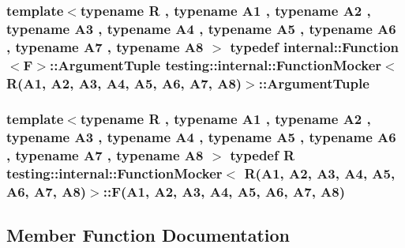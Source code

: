 \subsubsection[{\texorpdfstring{Argument\+Tuple}{ArgumentTuple}}]{\setlength{\rightskip}{0pt plus 5cm}template$<$typename R , typename A1 , typename A2 , typename A3 , typename A4 , typename A5 , typename A6 , typename A7 , typename A8 $>$ typedef {\bf internal\+::\+Function}$<${\bf F}$>$\+::{\bf Argument\+Tuple} {\bf testing\+::internal\+::\+Function\+Mocker}$<$ R(A1, A2, A3, A4, A5, A6, A7, A8)$>$\+::{\bf Argument\+Tuple}}\hypertarget{classtesting_1_1internal_1_1FunctionMocker_3_01R_07A1_00_01A2_00_01A3_00_01A4_00_01A5_00_01A6_00_01A7_00_01A8_08_4_a57bc2be00815deac8964e2d2ae62fdd2}{}\label{classtesting_1_1internal_1_1FunctionMocker_3_01R_07A1_00_01A2_00_01A3_00_01A4_00_01A5_00_01A6_00_01A7_00_01A8_08_4_a57bc2be00815deac8964e2d2ae62fdd2}
\subsubsection[{\texorpdfstring{F}{F}}]{\setlength{\rightskip}{0pt plus 5cm}template$<$typename R , typename A1 , typename A2 , typename A3 , typename A4 , typename A5 , typename A6 , typename A7 , typename A8 $>$ typedef R {\bf testing\+::internal\+::\+Function\+Mocker}$<$ R(A1, A2, A3, A4, A5, A6, A7, A8)$>$\+::F(A1, A2, A3, A4, A5, A6, A7, A8)}\hypertarget{classtesting_1_1internal_1_1FunctionMocker_3_01R_07A1_00_01A2_00_01A3_00_01A4_00_01A5_00_01A6_00_01A7_00_01A8_08_4_ad9749c93b0a17540778c5fa162a5fe6c}{}\label{classtesting_1_1internal_1_1FunctionMocker_3_01R_07A1_00_01A2_00_01A3_00_01A4_00_01A5_00_01A6_00_01A7_00_01A8_08_4_ad9749c93b0a17540778c5fa162a5fe6c}


\subsection{Member Function Documentation}

